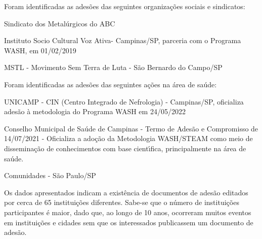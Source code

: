 \documentclass[
12pt,		%
openright,	%
twoside,  %
a4paper,			%
chapter=TITLE,		%
english,			%
french,				%
spanish,			%
brazil				%
]{USPSC-classe/USPSC}
\begin{document}
Foram identificadas as ades\~oes das seguintes organiza\c{c}\~oes sociais e sindicatos:


















\begin{alineas}
\item Sindicato dos Metal\'urgicos do ABC
\item Instituto Socio Cultural Voz Ativa- Campinas/SP,  parceria com o Programa WASH, em 01/02/2019
\item MSTL - Movimento Sem Terra de Luta - S\~ao Bernardo do Campo/SP
\end{alineas}

Foram identificadas as ades\~oes das seguintes a\c{c}\~oes na \'area de sa\'ude:


















\begin{alineas}
\item UNICAMP - CIN (Centro Integrado de Nefrologia) - Campinas/SP, oficializa ades\~ao \`a metodologia do Programa WASH em 24/05/2022
\item Conselho Municipal de  Sa\'ude de Campinas - Termo de Ades\~ao e Compromisso de 14/07/2021 - Oficializa a ado\c{c}\~ao da Metodologia WASH/STEAM como meio de dissemina\c{c}\~ao de conhecimentos com base cient\'{\i}fica, principalmente na \'area de sa\'ude.
\item Comunidades - S\~ao Paulo/SP
\end{alineas}

Os dados apresentados indicam a exist\^encia de documentos de ades\~ao editados por cerca de 65 institui\c{c}\~oes diferentes. Sabe-se que o n\'umero de institui\c{c}\~oes participantes \'e maior, dado que, ao longo de 10 anos, ocorreram muitos eventos em institui\c{c}\~oes e cidades sem que os interessados publicassem um documento de ades\~ao.
\end{document}
